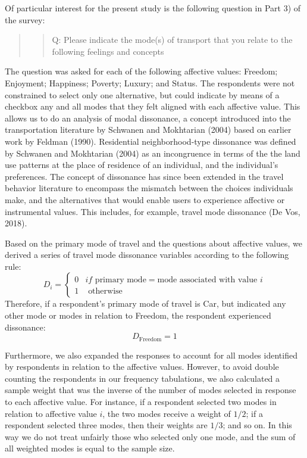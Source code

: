 \documentclass[]{elsarticle} %
\begin{document}
Of particular interest for the present study is the following question
in Part 3) of the survey:

\begin{quote}
\begin{quote}
Q: Please indicate the mode(s) of transport that you relate to the
following feelings and concepts
\end{quote}
\end{quote}

The question was asked for each of the following affective values:
Freedom; Enjoyment; Happiness; Poverty; Luxury; and Status. The
respondents were not constrained to select only one alternative, but
could indicate by means of a checkbox any and all modes that they felt
aligned with each affective value. This allows us to do an analysis of
modal dissonance, a concept introduced into the transportation
literature by Schwanen and Mokhtarian (2004) based on earlier work by
Feldman (1990). Residential neighborhood-type dissonance was defined by
Schwanen and Mokhtarian (2004) as an incongruence in terms of the the
land use patterns at the place of residence of an individual, and the
individual's preferences. The concept of dissonance has since been
extended in the travel behavior literature to encompass the mismatch
between the choices individuals make, and the alternatives that would
enable users to experience affective or instrumental values. This
includes, for example, travel mode dissonance (De Vos, 2018).

Based on the primary mode of travel and the questions about affective
values, we derived a series of travel mode dissonance variables
according to the following rule: \[
D_i = 
\begin{cases}
0 & if \text{ primary mode} = \text{mode associated with value } i\\
1 & \text{ otherwise}
\end{cases}
\] Therefore, if a respondent's primary mode of travel is Car, but
indicated any other mode or modes in relation to Freedom, the respondent
experienced dissonance: \[
D_{\text{Freedom}} = 1
\]

Furthermore, we also expanded the responses to account for all modes
identified by respondents in relation to the affective values. However,
to avoid double counting the respondents in our frequency tabulations,
we also calculated a sample weight that was the inverse of the number of
modes selected in response to each affective value. For instance, if a
respondent selected two modes in relation to affective value \(i\), the
two modes receive a weight of \(1/2\); if a respondent selected three
modes, then their weights are \(1/3\); and so on. In this way we do not
treat unfairly those who selected only one mode, and the sum of all
weighted modes is equal to the sample size.
\end{document}
